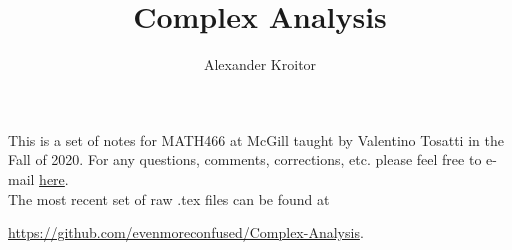 \documentclass{notes}
\begin{document}
\author{Alexander Kroitor}

\begin{titlepage}
    \title{Complex Analysis}
    \maketitle
\end{titlepage}



\setcounter{lecnum}{0}
\setcounter{page}{1}
\tableofcontents

\newpage

\begin{note}
This is a set of notes for MATH466 at McGill taught by Valentino Tosatti in the Fall of 2020. For any questions, comments, corrections, etc. please feel free to e-mail \href{mailto:alexander.kroitor@mail.mcgill.ca}{here}.\\
 
The most recent set of raw .tex files can be found at
\begin{center}
    \url{https://github.com/evenmoreconfused/Complex-Analysis}.
\end{center}
\end{note}












 


















\end{document}
